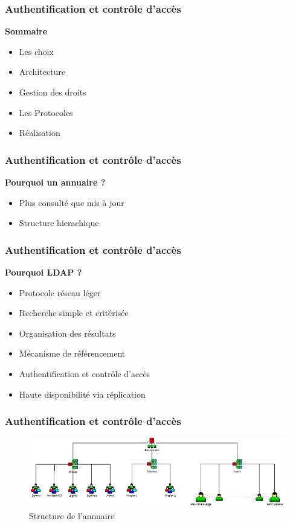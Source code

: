 \begin{frame}
  \frametitle{Authentification et contrôle d'accès}
  \begin{block}{\textbf{ Sommaire }}
  \begin{itemize}
  \item Les choix
  \item Architecture
  \item Gestion des droits
  \item Les Protocoles
  \item Réalisation
  \end{itemize}
  \end{block}
\end{frame}

\begin{frame}
  \frametitle{Authentification et contrôle d'accès}
  \begin{block}{\textbf{Pourquoi un annuaire ? }}
  \begin{itemize}
  \item Plus consulté que mis à jour
  \item Structure hierachique 
  \end{itemize} 
  \end{block}
\end{frame}

\begin{frame}
  \frametitle{Authentification et contrôle d'accès}
  \begin{block}{\textbf{Pourquoi LDAP ? }}
  \begin{itemize}
  \item Protocole réseau léger
  \item Recherche simple et critérisée
  \item Organisation des résultats
  \item Mécanisme de référencement
  \item Authentification et contrôle d'accès
  \item Haute disponibilité via réplication
  \end{itemize}
  \end{block}
\end{frame}

  \frametitle{Authentification et contrôle d'accès}
  \begin{figure}[htbp]
	  \centering
	  \includegraphics[scale=0.6]{Images/SchemaLDAP.png}
	  \caption{Structure de l'annuaire}
	  \label{SchemaLDAP}
  \end{figure}
 
